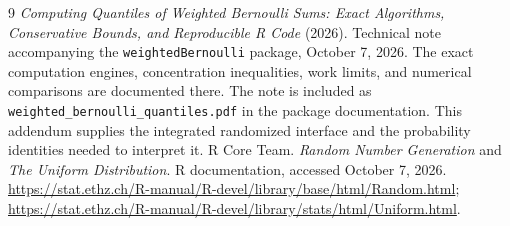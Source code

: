 \documentclass[11pt,letterpaper]{article}
\begin{document}
\begin{thebibliography}{9}
\emph{Computing Quantiles of Weighted Bernoulli Sums: Exact Algorithms,
Conservative Bounds, and Reproducible R Code} (2026).
Technical note accompanying the \texttt{weightedBernoulli} package,
October 7, 2026. The exact computation engines, concentration inequalities,
work limits, and numerical comparisons are documented there. The note is
included as \texttt{weighted\_bernoulli\_quantiles.pdf} in the package
documentation. This addendum supplies the integrated randomized interface
and the probability identities needed to interpret it.
R Core Team. \emph{Random Number Generation} and \emph{The Uniform Distribution}.
R documentation, accessed October 7, 2026.
\url{https://stat.ethz.ch/R-manual/R-devel/library/base/html/Random.html};
\url{https://stat.ethz.ch/R-manual/R-devel/library/stats/html/Uniform.html}.
\end{thebibliography}
\end{document}
